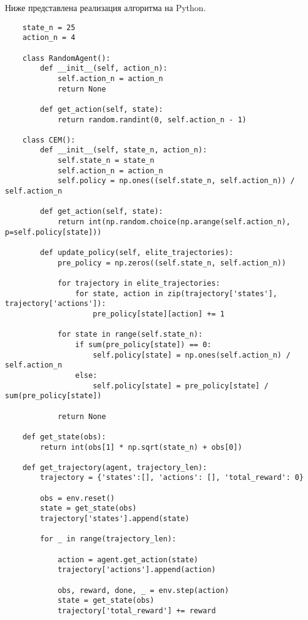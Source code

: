 Ниже представлена реализация алгоритма на Python.


\begin{lstlisting}
	state_n = 25
	action_n = 4
	
	class RandomAgent():
		def __init__(self, action_n):
			self.action_n = action_n
			return None
	
		def get_action(self, state):
			return random.randint(0, self.action_n - 1)
	
	class CEM():
		def __init__(self, state_n, action_n):
			self.state_n = state_n
			self.action_n = action_n
			self.policy = np.ones((self.state_n, self.action_n)) / self.action_n
	
		def get_action(self, state):
			return int(np.random.choice(np.arange(self.action_n), p=self.policy[state]))
	
		def update_policy(self, elite_trajectories):
			pre_policy = np.zeros((self.state_n, self.action_n))
			
			for trajectory in elite_trajectories:
				for state, action in zip(trajectory['states'], trajectory['actions']):
					pre_policy[state][action] += 1
			
			for state in range(self.state_n):
				if sum(pre_policy[state]) == 0:
					self.policy[state] = np.ones(self.action_n) / self.action_n
				else:
					self.policy[state] = pre_policy[state] / sum(pre_policy[state])
			
			return None
	
	def get_state(obs):
		return int(obs[1] * np.sqrt(state_n) + obs[0])
	
	def get_trajectory(agent, trajectory_len):
		trajectory = {'states':[], 'actions': [], 'total_reward': 0}
		
		obs = env.reset()
		state = get_state(obs)
		trajectory['states'].append(state)
		
		for _ in range(trajectory_len):
		
			action = agent.get_action(state)
			trajectory['actions'].append(action)
			
			obs, reward, done, _ = env.step(action)
			state = get_state(obs)
			trajectory['total_reward'] += reward
			

\end{lstlisting}
